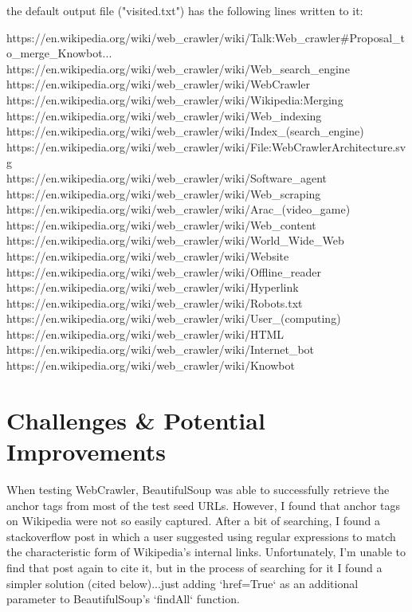 \documentclass{article}
\begin{document}
\noindent the default output file ("visited.txt") has the following lines written to it:\\
\begin{addmargin}[1em]{}
https://en.wikipedia.org/wiki/web\_crawler/wiki/Talk:Web\_crawler#Proposal\_to\_merge\_Knowbot...\\
https://en.wikipedia.org/wiki/web\_crawler/wiki/Web\_search\_engine\\
https://en.wikipedia.org/wiki/web\_crawler/wiki/WebCrawler\\
https://en.wikipedia.org/wiki/web\_crawler/wiki/Wikipedia:Merging\\
https://en.wikipedia.org/wiki/web\_crawler/wiki/Web\_indexing\\
https://en.wikipedia.org/wiki/web\_crawler/wiki/Index\_(search\_engine)\\
https://en.wikipedia.org/wiki/web\_crawler/wiki/File:WebCrawlerArchitecture.svg\\
https://en.wikipedia.org/wiki/web\_crawler/wiki/Software\_agent\\
https://en.wikipedia.org/wiki/web\_crawler/wiki/Web\_scraping\\
https://en.wikipedia.org/wiki/web\_crawler/wiki/Arac\_(video\_game)\\
https://en.wikipedia.org/wiki/web\_crawler/wiki/Web\_content\\
https://en.wikipedia.org/wiki/web\_crawler/wiki/World\_Wide\_Web\\
https://en.wikipedia.org/wiki/web\_crawler/wiki/Website\\
https://en.wikipedia.org/wiki/web\_crawler/wiki/Offline\_reader\\
https://en.wikipedia.org/wiki/web\_crawler/wiki/Hyperlink\\
https://en.wikipedia.org/wiki/web\_crawler/wiki/Robots.txt\\
https://en.wikipedia.org/wiki/web\_crawler/wiki/User\_(computing)\\
https://en.wikipedia.org/wiki/web\_crawler/wiki/HTML\\
https://en.wikipedia.org/wiki/web\_crawler/wiki/Internet\_bot\\
https://en.wikipedia.org/wiki/web\_crawler/wiki/Knowbot\\
\end{addmargin}

\section{Challenges \& Potential Improvements}
When testing WebCrawler, BeautifulSoup was able to successfully retrieve the
anchor tags from most of the test seed URLs. However, I found that anchor tags
on Wikipedia were not so easily captured. After a bit of searching, I found a
stackoverflow post in which a user suggested using regular expressions to match
the characteristic form of Wikipedia's internal links. Unfortunately, I'm
unable to find that post again to cite it, but in the process of searching for
it I found a simpler solution (cited below)...just adding `href=True` as an
additional parameter to BeautifulSoup's `findAll` function.\\
\end{document}
